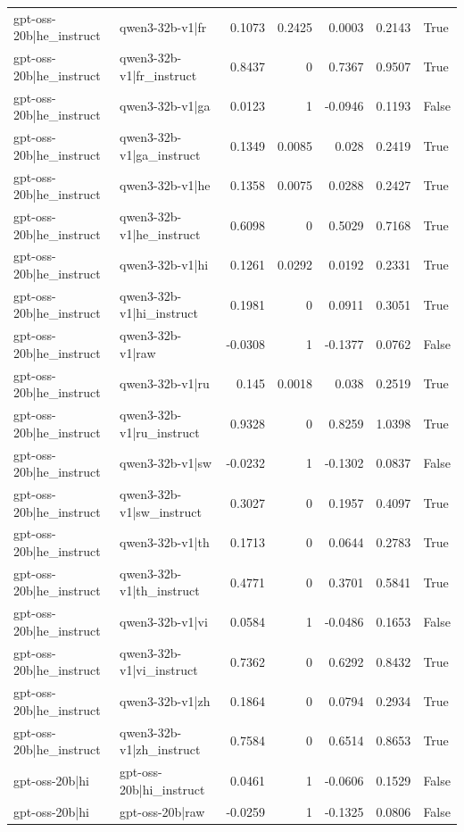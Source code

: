 \begin{table}
\begin{tabular}{l l r r r r l}
gpt-oss-20b|he_instruct & qwen3-32b-v1|fr & 0.1073 & 0.2425 & 0.0003 & 0.2143 & True \\
gpt-oss-20b|he_instruct & qwen3-32b-v1|fr_instruct & 0.8437 & 0 & 0.7367 & 0.9507 & True \\
gpt-oss-20b|he_instruct & qwen3-32b-v1|ga & 0.0123 & 1 & -0.0946 & 0.1193 & False \\
gpt-oss-20b|he_instruct & qwen3-32b-v1|ga_instruct & 0.1349 & 0.0085 & 0.028 & 0.2419 & True \\
gpt-oss-20b|he_instruct & qwen3-32b-v1|he & 0.1358 & 0.0075 & 0.0288 & 0.2427 & True \\
gpt-oss-20b|he_instruct & qwen3-32b-v1|he_instruct & 0.6098 & 0 & 0.5029 & 0.7168 & True \\
gpt-oss-20b|he_instruct & qwen3-32b-v1|hi & 0.1261 & 0.0292 & 0.0192 & 0.2331 & True \\
gpt-oss-20b|he_instruct & qwen3-32b-v1|hi_instruct & 0.1981 & 0 & 0.0911 & 0.3051 & True \\
gpt-oss-20b|he_instruct & qwen3-32b-v1|raw & -0.0308 & 1 & -0.1377 & 0.0762 & False \\
gpt-oss-20b|he_instruct & qwen3-32b-v1|ru & 0.145 & 0.0018 & 0.038 & 0.2519 & True \\
gpt-oss-20b|he_instruct & qwen3-32b-v1|ru_instruct & 0.9328 & 0 & 0.8259 & 1.0398 & True \\
gpt-oss-20b|he_instruct & qwen3-32b-v1|sw & -0.0232 & 1 & -0.1302 & 0.0837 & False \\
gpt-oss-20b|he_instruct & qwen3-32b-v1|sw_instruct & 0.3027 & 0 & 0.1957 & 0.4097 & True \\
gpt-oss-20b|he_instruct & qwen3-32b-v1|th & 0.1713 & 0 & 0.0644 & 0.2783 & True \\
gpt-oss-20b|he_instruct & qwen3-32b-v1|th_instruct & 0.4771 & 0 & 0.3701 & 0.5841 & True \\
gpt-oss-20b|he_instruct & qwen3-32b-v1|vi & 0.0584 & 1 & -0.0486 & 0.1653 & False \\
gpt-oss-20b|he_instruct & qwen3-32b-v1|vi_instruct & 0.7362 & 0 & 0.6292 & 0.8432 & True \\
gpt-oss-20b|he_instruct & qwen3-32b-v1|zh & 0.1864 & 0 & 0.0794 & 0.2934 & True \\
gpt-oss-20b|he_instruct & qwen3-32b-v1|zh_instruct & 0.7584 & 0 & 0.6514 & 0.8653 & True \\
gpt-oss-20b|hi & gpt-oss-20b|hi_instruct & 0.0461 & 1 & -0.0606 & 0.1529 & False \\
gpt-oss-20b|hi & gpt-oss-20b|raw & -0.0259 & 1 & -0.1325 & 0.0806 & False \\

\end{tabular}
\end{table}
